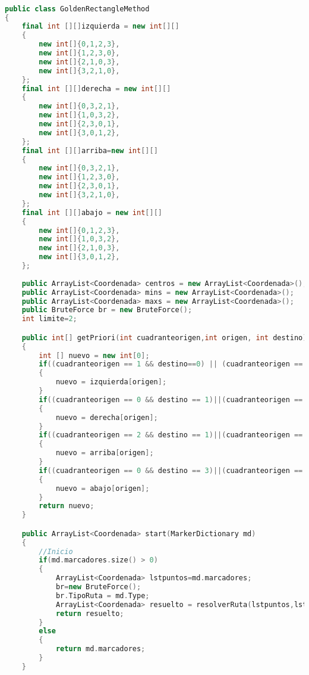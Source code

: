 \begin{lstlisting}[language=C++, caption=Algoritmo Base del Método de Cuadrantes, label=lst:codigo11,escapechar=|]

public class GoldenRectangleMethod 
{  
	final int [][]izquierda = new int[][]
	{
		new int[]{0,1,2,3},
		new int[]{1,2,3,0}, 
		new int[]{2,1,0,3},
		new int[]{3,2,1,0},
	}; 
	final int [][]derecha = new int[][]
	{
		new int[]{0,3,2,1},
		new int[]{1,0,3,2}, 
		new int[]{2,3,0,1},
		new int[]{3,0,1,2},
	}; 
	final int [][]arriba=new int[][]
	{
		new int[]{0,3,2,1},
		new int[]{1,2,3,0}, 
		new int[]{2,3,0,1},
		new int[]{3,2,1,0},
	};    
	final int [][]abajo = new int[][]
	{
		new int[]{0,1,2,3},
		new int[]{1,0,3,2}, 
		new int[]{2,1,0,3},
		new int[]{3,0,1,2},
	};    
		
	public ArrayList<Coordenada> centros = new ArrayList<Coordenada>();
	public ArrayList<Coordenada> mins = new ArrayList<Coordenada>();     
	public ArrayList<Coordenada> maxs = new ArrayList<Coordenada>();
	public BruteForce br = new BruteForce();
	int limite=2; 

	public int[] getPriori(int cuadranteorigen,int origen, int destino)
	{
		int [] nuevo = new int[0];
		if((cuadranteorigen == 1 && destino==0) || (cuadranteorigen == 2 && destino == 3) || (destino < 0)||(destino > 3)) 
		{
			nuevo = izquierda[origen];		
		}
		if((cuadranteorigen == 0 && destino == 1)||(cuadranteorigen == 3 && destino == 2)) 
		{
			nuevo = derecha[origen];
		}
		if((cuadranteorigen == 2 && destino == 1)||(cuadranteorigen == 3 && destino == 0))
		{
			nuevo = arriba[origen];		
		}
		if((cuadranteorigen == 0 && destino == 3)||(cuadranteorigen == 1 && destino == 2))
		{
			nuevo = abajo[origen];		
		}
		return nuevo;
	}

	public ArrayList<Coordenada> start(MarkerDictionary md)
	{
		//Inicio 
		if(md.marcadores.size() > 0)
		{
			ArrayList<Coordenada> lstpuntos=md.marcadores;
			br=new BruteForce();
			br.TipoRuta = md.Type;
			ArrayList<Coordenada> resuelto = resolverRuta(lstpuntos,lstpuntos.get(0),-1,-1);
			return resuelto;
		}
		else 
		{
			return md.marcadores;
		}
	}


\end{lstlisting}
